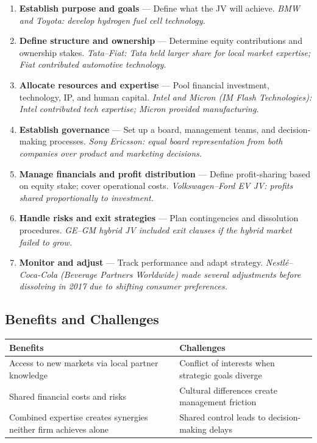 \documentclass[11pt, letterpaper]{article}
\begin{document}
\begin{enumerate}[leftmargin=*, label=\textbf{Step \arabic*.}]
  \item \textbf{Establish purpose and goals} --- Define what the JV will achieve. \textit{BMW and Toyota: develop hydrogen fuel cell technology.}
  \item \textbf{Define structure and ownership} --- Determine equity contributions and ownership stakes. \textit{Tata--Fiat: Tata held larger share for local market expertise; Fiat contributed automotive technology.}
  \item \textbf{Allocate resources and expertise} --- Pool financial investment, technology, IP, and human capital. \textit{Intel and Micron (IM Flash Technologies): Intel contributed tech expertise; Micron provided manufacturing.}
  \item \textbf{Establish governance} --- Set up a board, management teams, and decision-making processes. \textit{Sony Ericsson: equal board representation from both companies over product and marketing decisions.}
  \item \textbf{Manage financials and profit distribution} --- Define profit-sharing based on equity stake; cover operational costs. \textit{Volkswagen--Ford EV JV: profits shared proportionally to investment.}
  \item \textbf{Handle risks and exit strategies} --- Plan contingencies and dissolution procedures. \textit{GE--GM hybrid JV included exit clauses if the hybrid market failed to grow.}
  \item \textbf{Monitor and adjust} --- Track performance and adapt strategy. \textit{Nestlé--Coca-Cola (Beverage Partners Worldwide) made several adjustments before dissolving in 2017 due to shifting consumer preferences.}
\end{enumerate}

\subsection{Benefits and Challenges}

\begin{center}
\begin{tabular}{p{6.5cm} p{6.5cm}}
\toprule
\textbf{Benefits} & \textbf{Challenges} \\
\midrule
Access to new markets via local partner knowledge & Conflict of interests when strategic goals diverge \\
Shared financial costs and risks & Cultural differences create management friction \\
Combined expertise creates synergies neither firm achieves alone & Shared control leads to decision-making delays \\
\bottomrule
\end{tabular}
\end{center}
\end{document}
